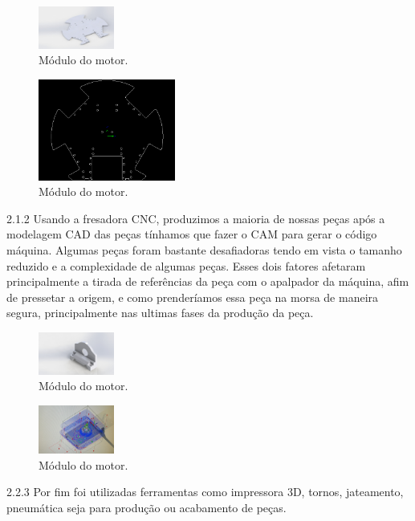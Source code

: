 \documentclass[letterpaper, 10 pt, conference]{ieeeconf}  %
\begin{document}
\begin{figure}[thpb]	
	\includegraphics[width=2.5cm]{img/mec4}
	\caption{Módulo do motor.}
	\label{img:modulomotor}
\end{figure}
\begin{figure}[thpb]	
	\centering
	\includegraphics[width=4.5cm]{img/mec5}
	\caption{Módulo do motor.}
	\label{img:modulomotor}
\end{figure}
2.1.2 Usando a fresadora CNC, produzimos a maioria de nossas peças após a modelagem CAD
das peças tínhamos que fazer o CAM para gerar o código máquina. Algumas peças foram
bastante desafiadoras tendo em vista o tamanho reduzido e a complexidade de algumas
peças. Esses dois fatores afetaram principalmente a tirada de referências da peça com o
apalpador da máquina, afim de pressetar a origem, e como prenderíamos essa peça na morsa
de maneira segura, principalmente nas ultimas fases da produção da peça.
\begin{figure}[thpb]	
	\includegraphics[width=2.5cm]{img/mec6}
	\caption{Módulo do motor.}
	\label{img:modulomotor}
\end{figure}
\begin{figure}[thpb]	
	\includegraphics[width=2.5cm]{img/mec7}
	\caption{Módulo do motor.}
	\label{img:modulomotor}
\end{figure}
2.2.3 Por fim foi utilizadas ferramentas como impressora 3D, tornos, jateamento, pneumática
seja para produção ou acabamento de peças.
\end{document}
